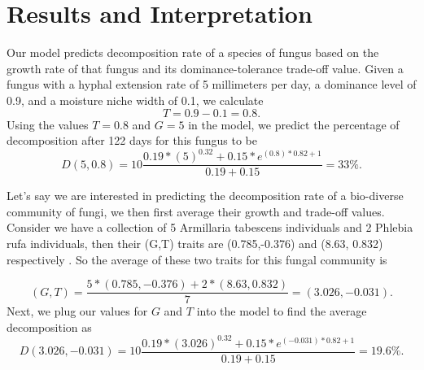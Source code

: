 \documentclass[12pt]{article}
\begin{document}

\section{Results and Interpretation}

Our model predicts decomposition rate of a species of fungus based on the growth rate of that fungus and its dominance-tolerance trade-off value. Given a fungus with a hyphal extension rate of 5 millimeters per day, a dominance level of 0.9, and a moisture niche width of 0.1, we calculate 
\[
T = 0.9 - 0.1 = 0.8.
\]
Using the values $T = 0.8$ and $G = 5$ in the model, we predict the percentage of decomposition after 122 days for this fungus to be
\[
D(5,0.8) =  10 \frac{0.19*(5)^{0.32} + 0.15 * e^{(0.8)*0.82+1}}{0.19+0.15}
= 33 \%.
\]

Let's say we are interested in predicting the decomposition rate of a bio-diverse community of fungi, we then first average their growth and trade-off values. Consider we have a collection of 5  Armillaria tabescens individuals and 2 Phlebia rufa individuals, then their (G,T) traits are (0.785,-0.376) and (8.63, 0.832) respectively \cite{source25}. So the average of these two traits for this fungal community is

\[ (G,T) = \frac{5 * (0.785,-0.376) + 2 * (8.63, 0.832)}{7} = (3.026, -0.031). 
\]
Next, we plug our values for $G$ and $T$ into the model to find the average decomposition as
\[
D(3.026, -0.031) = 10 \frac{0.19*(3.026)^{0.32} + 0.15 * e^{(-0.031)*0.82+1}}{0.19+0.15} =  19.6 \%.
\]
\end{document}
